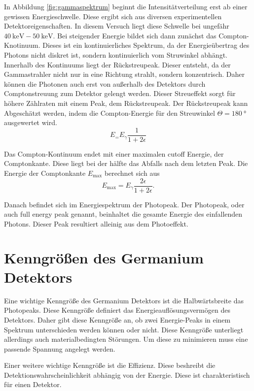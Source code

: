 In Abbildung \ref{fig:gammaspektrum} beginnt die Intensitätverteilung erst ab einer gewissen Energieschwelle. Diese ergibt sich aus diversen experimentellen Detektoreigenschaften. 
In diesem Versuch liegt diese Schwelle bei ungefähr $\qty{40}{\kilo\electronvolt} - \qty{50}{\kilo\electronvolt}$. Bei steigender Energie bildet sich dann zunächst das 
Compton-Knotinuum. Dieses ist ein kontinuierliches Spektrum, da der Energieübertrag des Photons nicht diskret ist, sondern kontinuierlich vom Struwinkel abhängt. Innerhalb des 
Kontinuums liegt der Rückstreupeak. Dieser entsteht, da der Gammastrahler nicht nur in eine Richtung strahlt, sondern konzentrisch. Daher können die Photonen auch erst von außerhalb 
des Detektors durch Comptonstreuung zum Detektor gelengt werden. Dieser Streueffekt sorgt für höhere Zählraten mit einem Peak, dem Rückstreupeak. Der Rückstreupeak kann Abgeschätzt 
werden, indem die Compton-Energie für den Streuwinkel $\Theta=\qty{180}{\degree}$ ausgewertet wird. 
\begin{equation}
    \label{eqn:Rückstreupeak}
    E_ = E_{\gamma}\frac{1}{1+2\epsilon}
\end{equation}

Das Compton-Kontinuum endet mit einer maximalen cutoff Energie, der Comptonkante. Diese liegt bei der hälfte das Abfalls nach dem letzten Peak. Die Energie der Comptonkante 
$E_\mathrm{max}$ berechnet sich aus 
\begin{equation}
    \label{eqn:comptonkante}
    E_\mathrm{max} = E_{\gamma}\frac{2\epsilon}{1+2\epsilon}.
\end{equation}

Danach befindet sich im Energiespektrum der Photopeak. Der Photopeak, oder auch full energy peak genannt, beinhaltet die gesamte Energie des einfallenden Photons. Dieser Peak resultiert
alleinig aus dem Photoeffekt. 

\section{Kenngrößen des Germanium Detektors}
\label{sec:Kenngroessen}
Eine wichtige Kenngröße des Germanium Detektors ist die Halbwärtsbreite das Photopeaks. Diese Kenngröße definiert das Energieauflösungsvermögen des Detektors. Daher gibt diese 
Kenngröße an, ob zwei Energie-Peaks in einem Spektrum unterschieden werden können oder nicht. Diese Kenngröße unterliegt allerdings auch materialbedingten Störungen. Um diese 
zu minimieren muss eine passende Spannung angelegt werden. 

Einer weitere wichtige Kenngröße ist die Effizienz. Diese beshreibt die Detektionswahrscheinlichkeit abhängig von der Energie. Diese ist charakteristisch für einen Detektor.

